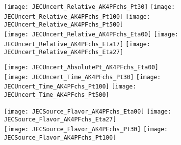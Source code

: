 \documentclass[landscape,10pt]{beamer} %
\begin{document}
\newpage 

\begin{figure}[p]
\centering
  \texttt{[image: JECUncert\_Relative\_AK4PFchs\_Pt30]}
  \texttt{[image: JECUncert\_Relative\_AK4PFchs\_Pt100]}
  \texttt{[image: JECUncert\_Relative\_AK4PFchs\_Pt500]}\\
  \texttt{[image: JECUncert\_Relative\_AK4PFchs\_Eta00]}
  \texttt{[image: JECUncert\_Relative\_AK4PFchs\_Eta17]}
  \texttt{[image: JECUncert\_Relative\_AK4PFchs\_Eta27]}
\end{figure}

\newpage

\begin{figure}[p]
\centering
  \texttt{[image: JECUncert\_AbsolutePt\_AK4PFchs\_Eta00]}\\
  \texttt{[image: JECUncert\_Time\_AK4PFchs\_Pt30]}
  \texttt{[image: JECUncert\_Time\_AK4PFchs\_Pt100]}
  \texttt{[image: JECUncert\_Time\_AK4PFchs\_Pt500]}
\end{figure}

\newpage

\begin{figure}[p]
\centering
\texttt{[image: JECSource\_Flavor\_AK4PFchs\_Eta00]}
\texttt{[image: JECSource\_Flavor\_AK4PFchs\_Eta27]}\\
\texttt{[image: JECSource\_Flavor\_AK4PFchs\_Pt30]}
\texttt{[image: JECSource\_Flavor\_AK4PFchs\_Pt100]}
\end{figure}
\end{document}
